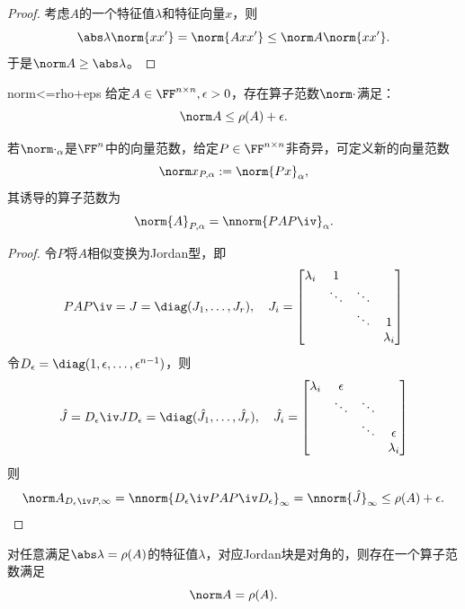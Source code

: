 \begin{proof}
    考虑$A$的一个特征值$\lambda$和特征向量$x$，则 
    \[
        \abs\lambda\norm{xx'}=\norm{Axx'}\leq\norm A\norm{xx'}.
    \]
    于是$\norm A\geq\abs\lambda$。
\end{proof}

\begin{theorem}
    {}{norm<=rho+eps}
    给定$A\in\FF^{n\times n},\epsilon>0$，存在算子范数$\norm\cdot$满足：
    \begin{equation}
        \norm A\leq\rho(A)+\epsilon.
    \end{equation}
\end{theorem}

\begin{lemma}
    若$\norm\cdot_\alpha$是$\FF^n$中的向量范数，给定$P\in\FF^{n\times n}$非奇异，可定义新的向量范数
    \[
        \norm x_{P,\alpha}:=\norm{Px}_\alpha,
    \]
    其诱导的算子范数为
    \[
        \norm{A}_{P,\alpha}=\nnorm{PAP\iv}_\alpha.
    \]
\end{lemma}

\begin{proof}
    令$P$将$A$相似变换为Jordan型，即
    \[
        PAP\iv=J=\diag(J_1,\ldots,J_r),\quad J_i=\begin{bmatrix}
            \lambda_i&1\\
            &\ddots&\ddots\\
            &&\ddots&1\\
            &&&\lambda_i
        \end{bmatrix}
    \]
    令$D_\epsilon=\diag(1,\epsilon,\ldots,\epsilon^{n-1})$，则 
    \[
        \hat J=D_\epsilon\iv JD_\epsilon=\diag(\hat J_1,\ldots,\hat J_r),\quad\hat J_i=\begin{bmatrix}
            \lambda_i&\epsilon\\
            &\ddots&\ddots\\
            &&\ddots&\epsilon\\
            &&&\lambda_i
        \end{bmatrix}
    \]
    则
    \[
        \norm A_{D_\epsilon\iv P,\infty}=\nnorm{D_\epsilon\iv PAP\iv D_\epsilon}_\infty=\nnorm{\hat J}_\infty\leq\rho(A)+\epsilon.
        \qedhere
    \]
\end{proof}

\begin{remark}
    对任意满足$\abs\lambda=\rho(A)$的特征值$\lambda$，对应Jordan块是对角的，则存在一个算子范数满足
    \[
        \norm A=\rho(A).
    \]
\end{remark}

